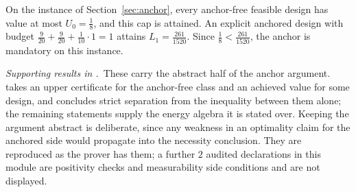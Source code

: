 \begin{theorem}
\label{thm:anchor}
On the instance of Section~\ref{sec:anchor}, every anchor-free feasible design has value at
most $U_{0}=\tfrac18$, and this cap is attained. An explicit anchored design with budget
$\tfrac{9}{20}+\tfrac{9}{20}+\tfrac{1}{10}\cdot1=1$ attains $L_{1}=\tfrac{261}{1520}$. Since
$\tfrac18<\tfrac{261}{1520}$, the anchor is mandatory on this instance.
\end{theorem}


\noindent\emph{Supporting results in .}~These carry the abstract half of the anchor argument.  takes an upper certificate for the anchor-free class and an achieved value for some design, and concludes strict separation from the inequality between them alone; the remaining statements supply the energy algebra it is stated over. Keeping the argument abstract is deliberate, since any weakness in an optimality claim for the anchored side would propagate into the necessity conclusion. They are reproduced as the prover has them; a further $2$ audited declarations in this module are positivity checks and measurability side conditions and are not displayed.

